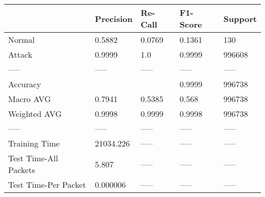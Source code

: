 \begin{tabular}{lllll}
\toprule
{} &  Precision & Re-Call & F1-Score & Support \\
\midrule
Normal                &     0.5882 &  0.0769 &   0.1361 &     130 \\
Attack                &     0.9999 &     1.0 &   0.9999 &  996608 \\
-----                 &      ----- &   ----- &    ----- &   ----- \\
Accuracy              &            &         &   0.9999 &  996738 \\
Macro AVG             &     0.7941 &  0.5385 &    0.568 &  996738 \\
Weighted AVG          &     0.9998 &  0.9999 &   0.9998 &  996738 \\
-----                 &      ----- &   ----- &    ----- &   ----- \\
Training Time         &  21034.226 &   ----- &    ----- &   ----- \\
Test Time-All Packets &      5.807 &   ----- &    ----- &   ----- \\
Test Time-Per Packet  &   0.000006 &   ----- &    ----- &   ----- \\
\bottomrule
\end{tabular}
